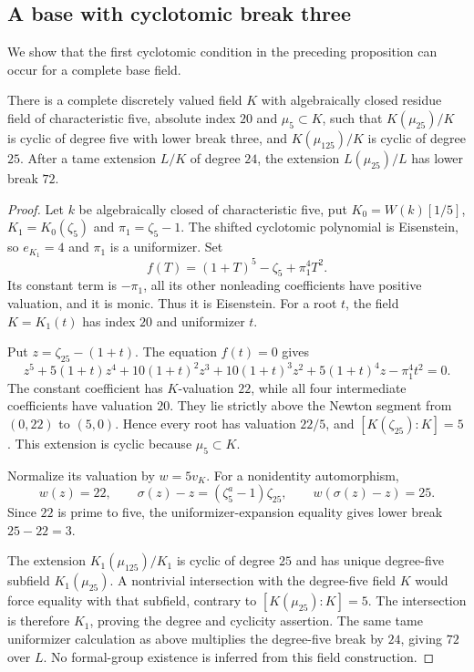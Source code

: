 \subsection{A base with cyclotomic break three}
We show that the first cyclotomic condition in the preceding proposition can occur for a complete base field.
\begin{proposition}\label{prop:break-three-base}
There is a complete discretely valued field $K$ with algebraically closed residue field of characteristic five, absolute index $20$ and $\mu_5\subset K$, such that $K(\mu_{25})/K$ is cyclic of degree five with lower break three, and $K(\mu_{125})/K$ is cyclic of degree $25$. After a tame extension $L/K$ of degree $24$, the extension $L(\mu_{25})/L$ has lower break $72$.
\end{proposition}
\begin{proof}
Let $k$ be algebraically closed of characteristic five, put $K_0=W(k)[1/5]$, $K_1=K_0(\zeta_5)$ and $\pi_1=\zeta_5-1$. The shifted cyclotomic polynomial is Eisenstein, so $e_{K_1}=4$ and $\pi_1$ is a uniformizer. Set
\[
                  f(T)=(1+T)^5-\zeta_5+\pi_1^4T^2.
\]
Its constant term is $-\pi_1$, all its other nonleading coefficients have positive valuation, and it is monic. Thus it is Eisenstein. For a root $t$, the field $K=K_1(t)$ has index $20$ and uniformizer $t$.

Put $z=\zeta_{25}-(1+t)$. The equation $f(t)=0$ gives
\[
 z^5+5(1+t)z^4+10(1+t)^2z^3+10(1+t)^3z^2
           +5(1+t)^4z-\pi_1^4t^2=0.
\]
The constant coefficient has $K$-valuation $22$, while all four intermediate coefficients have valuation $20$. They lie strictly above the Newton segment from $(0,22)$ to $(5,0)$. Hence every root has valuation $22/5$, and $[K(\zeta_{25}):K]=5$. This extension is cyclic because $\mu_5\subset K$.

Normalize its valuation by $w=5v_K$. For a nonidentity automorphism,
\[
 w(z)=22,\qquad
 \sigma(z)-z=(\zeta_5^a-1)\zeta_{25},\qquad
 w(\sigma(z)-z)=25.
\]
Since $22$ is prime to five, the uniformizer-expansion equality gives lower break $25-22=3$.

The extension $K_1(\mu_{125})/K_1$ is cyclic of degree $25$ and has unique degree-five subfield $K_1(\mu_{25})$. A nontrivial intersection with the degree-five field $K$ would force equality with that subfield, contrary to $[K(\mu_{25}):K]=5$. The intersection is therefore $K_1$, proving the degree and cyclicity assertion. The same tame uniformizer calculation as above multiplies the degree-five break by $24$, giving $72$ over $L$. No formal-group existence is inferred from this field construction.
\end{proof}
